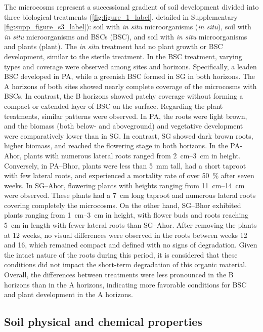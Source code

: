 The microcosms represent a successional gradient of soil development divided into three biological treatments (\cref{fig:figure_1_label}, detailed in Supplementary \cref{fig:supp_figure_s3_label}): soil with \textit{in situ} microorganisms (\textit{in situ}), soil with \textit{in situ} microorganisms and BSCs (BSC), and soil with \textit{in situ} microorganisms and plants (plant). The \textit{in situ} treatment had no plant growth or BSC development, similar to the sterile treatment. In the BSC treatment, varying types and coverage were observed among sites and horizons. Specifically, a leaden BSC developed in PA, while a greenish BSC formed in SG in both horizons. The A horizons of both sites showed nearly complete coverage of the microcosms with BSCs. In contrast, the B horizons showed patchy coverage without forming a compact or extended layer of BSC on the surface. Regarding the plant treatments, similar patterns were observed. In PA, the roots were light brown, and the biomass (both below- and aboveground) and vegetative development were comparatively lower than in SG. In contrast, SG showed dark brown roots, higher biomass, and reached the flowering stage in both horizons. In the PA-Ahor, plants with numerous lateral roots ranged from \SIrange{2}{3}{\centi\metre} in height. Conversely, in PA–Bhor, plants were less than \SI{5}{\milli\metre} tall, had a short taproot with few lateral roots, and experienced a mortality rate of over \SI{50}{\percent} after seven weeks. In SG–Ahor, flowering plants with heights ranging from \SIrange{11}{14}{\centi\metre} were observed. These plants had a \SI{7}{\centi\metre} long taproot and numerous lateral roots covering completely the microcosms. On the other hand, SG–Bhor exhibited plants ranging from \SIrange{1}{3}{\centi\metre} in height, with flower buds and roots reaching \SI{5}{\centi\metre} in length with fewer lateral roots than SG–Ahor. After removing the plants at 12 weeks, no visual differences were observed in the roots between weeks 12 and 16, which remained compact and defined with no signs of degradation. Given the intact nature of the roots during this period, it is considered that these conditions did not impact the short-term degradation of this organic material. Overall, the differences between treatments were less pronounced in the B horizons than in the A horizons, indicating more favorable conditions for BSC and plant development in the A horizons.

\subsection{Soil physical and chemical properties}

